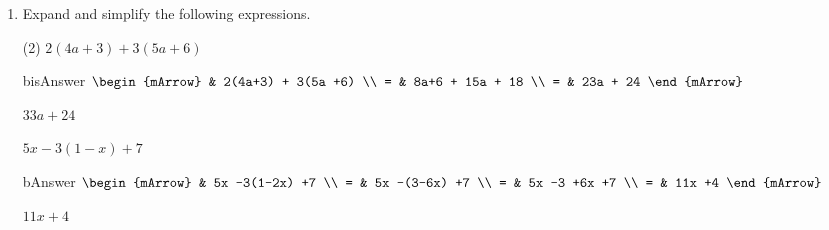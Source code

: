 \begin{enumerate}[resume]	
  \item Expand and simplify the following expressions.
  \begin{subtask}(2)
    \task[]  $ 2(4a+3) + 3(5a +6)  $
              \begin{envOut}[height=6cm]{bisAnswer}
			       $\begin{mArrow}
			                & 2(4a+3) + 3(5a +6)       \\ 
			              = & 8a+6 + 15a + 18       \\ 
                          = & 23a + 24   
	                \end{mArrow}$
              \end{envOut}			  
			  \begin{exercise}\begin{shortsolution}  
				       $33a + 24$
			  \end{shortsolution}\end{exercise}
			  
    \task[]  $ 5x -3(1-x) +7  $
              \begin{envOut}[height=6cm]{bAnswer}
			       $\begin{mArrow}
			                & 5x -3(1-2x) +7      \\ 
			              = & 5x -(3-6x) +7      \\
			              = & 5x -3 +6x  +7      \\ 
						  = & 11x +4  
	                \end{mArrow}$
              \end{envOut}			  
			  \begin{exercise}\begin{shortsolution}  
				       $11x +4$
			  \end{shortsolution}\end{exercise}			  
    \end{subtask}
\end{enumerate}



